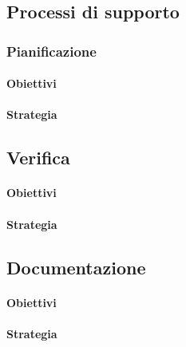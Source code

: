 \subsection{Processi di supporto}
	\subsubsection{Pianificazione}
		\paragraph{Obiettivi}
		\paragraph{Strategia}	
	\subsection{Verifica}
		\paragraph{Obiettivi}
		\paragraph{Strategia}	
	\subsection{Documentazione}
		\paragraph{Obiettivi}
		\paragraph{Strategia}	